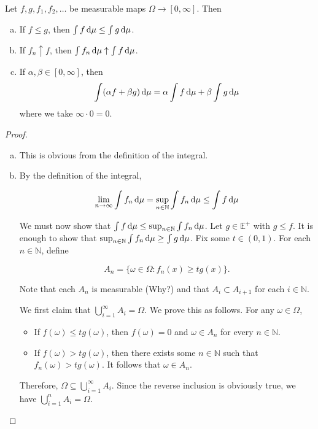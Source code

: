 \begin{theorem}
\label{properties of integral 2}
    Let $f,g,f_1,f_2,\ldots$ be measurable maps $\Omega\to[0,\infty]$. Then
    \begin{enumerate}[(a)]
        \item If $f\leq g$, then $\int f\operatorname{d}\!{\mu}\leq \int g\operatorname{d}\!{\mu}$.
        \item If $f_n \uparrow f$, then $\int f_n\operatorname{d}\!{\mu} \uparrow \int f\operatorname{d}\!{\mu}$.
        \item If $\alpha,\beta\in[0,\infty]$, then
        $$\int(\alpha f+\beta g)\operatorname{d}\!{\mu}=\alpha\int f\operatorname{d}\!{\mu} + \beta\int g\operatorname{d}\!{\mu}$$
        where we take $\infty\cdot 0=0$.
    \end{enumerate}
\end{theorem}
\begin{proof}
    ~
    \begin{enumerate}[(a)]
        \item This is obvious from the definition of the integral.
        
        \item By the definition of the integral,
        
        $$\lim_{n\to\infty}\int f_n\operatorname{d}\!{\mu}=\sup_{n\in\mathbb{N}}\int f_n\operatorname{d}\!{\mu}\leq \int f\operatorname{d}\!{\mu}$$
        
        We must now show that $\int f\operatorname{d}\!{\mu}\leq \sup_{n\in\mathbb{N}}\int f_n\operatorname{d}\!{\mu}$. Let $g\in\mathbb{E}^+$ with $g\leq f$. It is enough to show that $\sup_{n\in\mathbb{N}}\int f_n\operatorname{d}\!{\mu}\geq \int g\operatorname{d}\!{\mu}$.
        Fix some $t\in(0,1)$. For each $n\in\mathbb{N}$, define
        
        $$A_n = \{\omega\in\Omega:f_n(x)\geq tg(x)\}.$$
        
        Note that each $A_n$ is measurable (Why?) and that $A_i\subset A_{i+1}$ for each $i\in\mathbb{N}$.
        
        We first claim that $\bigcup_{i=1}^\infty A_i = \Omega$. We prove this as follows. For any $\omega\in\Omega$,
        \begin{itemize}
            \item If $f(\omega)\leq tg(\omega)$, then $f(\omega)=0$ and $\omega\in A_n$ for every $n\in\mathbb{N}$.
            
            \item If $f(\omega)> tg(\omega)$, then there exists some $n\in\mathbb{N}$ such that $f_n(\omega)>tg(\omega)$. It follows that $\omega\in A_n$.
        \end{itemize}
        Therefore, $\Omega\subseteq\bigcup_{i=1}^\infty A_i$. Since the reverse inclusion is obviously true, we have $\bigcup_{i=1}^n A_i = \Omega$.
        

\end{enumerate}
\end{proof}
